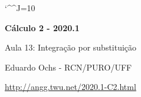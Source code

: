 \documentclass[oneside,12pt]{article}
\begin{document}
\catcode`\^^J=10


\long{}
\long{}
\long{}
\long{}
\long{}
\long{}
\long{}
\long{}
\long{}
\long{}

\long{}
\long{}

\def\frown{\ensuremath{{=}{(}}}
\def\True {\mathbf{V}}
\def\False{\mathbf{F}}
\def\Subst#1{\bmat{#1}}
\def\D{\displaystyle}

\def\drafturl{http://angg.twu.net/LATEX/2020-1-C2.pdf}
\def\drafturl{http://angg.twu.net/2020.1-C2.html}
\def\draftfooter{\tiny \href{\drafturl}{\jobname{}} \ColorBrown{\shorttoday{} \hours}}



%

\thispagestyle{empty}

\begin{center}

\vspace*{1.2cm}

{\bf \Large Cálculo 2 - 2020.1}

\bsk

Aula 13: Integração por substituição

\bsk

Eduardo Ochs - RCN/PURO/UFF

\url{http://angg.twu.net/2020.1-C2.html}

\end{center}

\newpage
\end{document}
